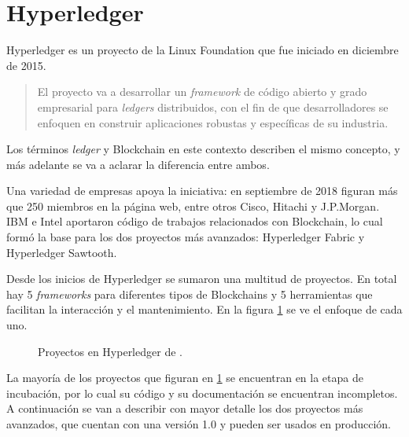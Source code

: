 \section{Hyperledger}

Hyperledger es un proyecto de la Linux Foundation que fue iniciado en diciembre de 2015.
\begin{quote}
El proyecto va a desarrollar un \textit{framework} de código abierto y grado empresarial para \textit{ledgers} distribuidos, con el fin de que desarrolladores se enfoquen en construir aplicaciones robustas y específicas de su industria.\cite{hyperledger_foundation}
\end{quote} 
Los términos \textit{ledger} y Blockchain en este contexto describen el mismo concepto, y más adelante se va a aclarar la diferencia entre ambos.

Una variedad de empresas apoya la iniciativa: en septiembre de 2018 figuran más que 250 miembros en la página web, entre otros Cisco, Hitachi y J.P.Morgan. IBM e Intel aportaron código de trabajos relacionados con Blockchain, lo cual formó la base para los dos proyectos más avanzados: Hyperledger Fabric y Hyperledger Sawtooth.

Desde los inicios de Hyperledger se sumaron una multitud de proyectos. En total hay 5 \textit{frameworks} para diferentes tipos de Blockchains y 5 herramientas que facilitan la interacción y el mantenimiento. En la figura \ref{fig:Selection_051} se ve el enfoque de cada uno.
\begin{figure}[H] %
\caption{Proyectos en Hyperledger de \cite{hl-projects}.}
\label{fig:Selection_051}
\end{figure}

La mayoría de los proyectos que figuran en \ref{fig:Selection_051} se encuentran en la etapa de incubación, por lo cual su código y su documentación se encuentran incompletos. A continuación se van a describir con mayor detalle los dos proyectos más avanzados, que cuentan con una versión 1.0 y pueden ser usados en producción.

